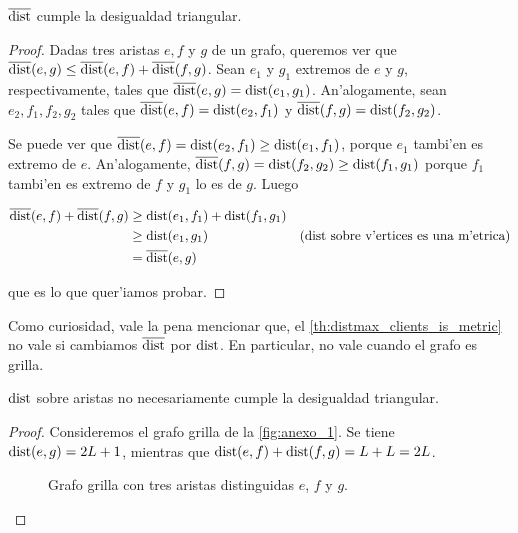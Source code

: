\begin{theorem}
\label{th:distmax_clients_is_metric}
$\overline{\textnormal{dist}}$ cumple la desigualdad triangular.

\begin{proof}
Dadas tres aristas $e, f$ y $g$ de un grafo, queremos ver que $\overline{\textnormal{dist}}(e, g) \leq \overline{\textnormal{dist}}(e, f) + \overline{\textnormal{dist}}(f, g)$. Sean $e_1$ y $g_1$ extremos de $e$ y $g$, respectivamente, tales que $\overline{\textnormal{dist}}(e, g) = \textnormal{dist}(e_1, g_1)$. An'alogamente, sean $e_2, f_1, f_2, g_2$ tales que $\overline{\textnormal{dist}}(e, f) = \textnormal{dist}(e_2, f_1)$ y $\overline{\textnormal{dist}}(f, g) = \textnormal{dist}(f_2, g_2)$.

Se puede ver que $\overline{\textnormal{dist}}(e, f) = \textnormal{dist}(e_2, f_1) \geq \textnormal{dist}(e_1, f_1)$, porque $e_1$ tambi'en es extremo de $e$. An'alogamente, $\overline{\textnormal{dist}}(f, g) = \textnormal{dist}(f_2, g_2) \geq \textnormal{dist}(f_1, g_1)$ porque $f_1$ tambi'en es extremo de $f$ y $g_1$ lo es de $g$. Luego

\begin{align*}
\overline{\textnormal{dist}}(e, f) + \overline{\textnormal{dist}}(f, g) &\geq \textnormal{dist}(e_1, f_1) + \textnormal{dist}(f_1, g_1) &\\
&\geq \textnormal{dist}(e_1, g_1) &\text{(} \textnormal{dist} \text{ sobre v'ertices es una m'etrica)}\\
&= \overline{\textnormal{dist}}(e, g)&
\end{align*}

\noindent
que es lo que quer'iamos probar.
\end{proof}
\end{theorem}

Como curiosidad, vale la pena mencionar que, el \autoref{th:distmax_clients_is_metric} no vale si cambiamos $\overline{\textnormal{dist}}$ por $\textnormal{dist}$. En particular, no vale cuando el grafo es grilla.

\begin{remark}
\label{re:dist_sobre_aristas_no_cumple_desigualdad_triangular}
$\textnormal{dist}$ sobre aristas no necesariamente cumple la desigualdad triangular.

\begin{proof}
Consideremos el grafo grilla de la \autoref{fig:anexo_1}. Se tiene $\textnormal{dist}(e, g) = 2L + 1$, mientras que $\textnormal{dist}(e, f) + \textnormal{dist}(f, g) = L + L = 2L$.

\begin{figure}[h]
	\begin{center}
		
	\end{center}		
	\caption{Grafo grilla con tres aristas distinguidas $e$, $f$ y $g$.}
	\label{fig:anexo_1}
\end{figure}

\end{proof}
\end{remark}


